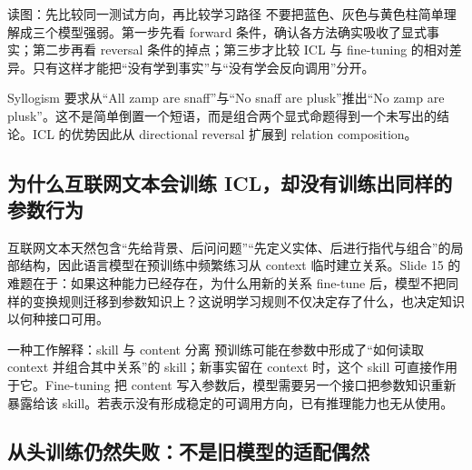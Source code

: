\begin{knowledgebox}{读图：先比较同一测试方向，再比较学习路径}
不要把蓝色、灰色与黄色柱简单理解成三个模型强弱。第一步先看 forward 条件，确认各方法确实吸收了显式事实；第二步再看 reversal 条件的掉点；第三步才比较 ICL 与 fine-tuning 的相对差异。只有这样才能把“没有学到事实”与“没有学会反向调用”分开。
\end{knowledgebox}


Syllogism 要求从“All zamp are snaff”与“No snaff are plusk”推出“No zamp are plusk”。这不是简单倒置一个短语，而是组合两个显式命题得到一个未写出的结论。ICL 的优势因此从 directional reversal 扩展到 relation composition。



\subsection{为什么互联网文本会训练 ICL，却没有训练出同样的参数行为}

互联网文本天然包含“先给背景、后问问题”“先定义实体、后进行指代与组合”的局部结构，因此语言模型在预训练中频繁练习从 context 临时建立关系。Slide 15 的难题在于：如果这种能力已经存在，为什么用新的关系 fine-tune 后，模型不把同样的变换规则迁移到参数知识上？这说明学习规则不仅决定存了什么，也决定知识以何种接口可用。


\begin{knowledgebox}{一种工作解释：skill 与 content 分离}
预训练可能在参数中形成了“如何读取 context 并组合其中关系”的 skill；新事实留在 context 时，这个 skill 可直接作用于它。Fine-tuning 把 content 写入参数后，模型需要另一个接口把参数知识重新暴露给该 skill。若表示没有形成稳定的可调用方向，已有推理能力也无从使用。
\end{knowledgebox}

\subsection{从头训练仍然失败：不是旧模型的适配偶然}

